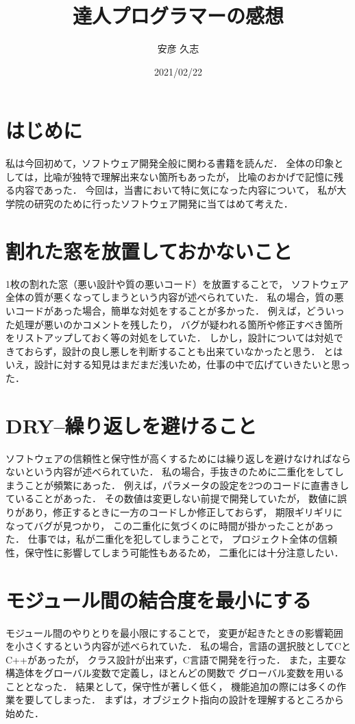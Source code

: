 \documentclass[10pt,oneside,a4paper,twocolumn,platex,dvipdfmx]{jarticle}
\title{達人プログラマーの感想}
\date{2021/02/22}
\author{安彦 久志}
\begin{document}
\maketitle
\thispagestyle{empty}
\section{はじめに}
私は今回初めて，ソフトウェア開発全般に関わる書籍を読んだ．
全体の印象としては，比喩が独特で理解出来ない箇所もあったが，
比喩のおかげで記憶に残る内容であった．
今回は，当書において特に気になった内容について，
私が大学院の研究のために行ったソフトウェア開発に当てはめて考えた．

\section{割れた窓を放置しておかないこと}
1枚の割れた窓（悪い設計や質の悪いコード）を放置することで，
ソフトウェア全体の質が悪くなってしまうという内容が述べられていた．
私の場合，質の悪いコードがあった場合，簡単な対処をすることが多かった．
例えば，どういった処理が悪いのかコメントを残したり，
バグが疑われる箇所や修正すべき箇所をリストアップしておく等の対処をしていた．
しかし，設計については対処できておらず，設計の良し悪しを判断することも出来ていなかったと思う．
とはいえ，設計に対する知見はまだまだ浅いため，仕事の中で広げていきたいと思った．

\section{DRY--繰り返しを避けること}
ソフトウェアの信頼性と保守性が高くするためには繰り返しを避けなければならないという内容が述べられていた．
私の場合，手抜きのために二重化をしてしまうことが頻繁にあった．
例えば，パラメータの設定を2つのコードに直書きしていることがあった．
その数値は変更しない前提で開発していたが，
数値に誤りがあり，修正するときに一方のコードしか修正しておらず，
期限ギリギリになってバグが見つかり，
この二重化に気づくのに時間が掛かったことがあった．
仕事では，私が二重化を犯してしまうことで，
プロジェクト全体の信頼性，保守性に影響してしまう可能性もあるため，
二重化には十分注意したい．

\section{モジュール間の結合度を最小にする}
モジュール間のやりとりを最小限にすることで，
変更が起きたときの影響範囲を小さくするという内容が述べられていた．
私の場合，言語の選択肢としてCとC++があったが，
クラス設計が出来ず，C言語で開発を行った．
また，主要な構造体をグローバル変数で定義し，ほとんどの関数で
グローバル変数を用いることとなった．
結果として，保守性が著しく低く，
機能追加の際には多くの作業を要してしまった．
まずは，オブジェクト指向の設計を理解するところから始めた．
\end{document}
